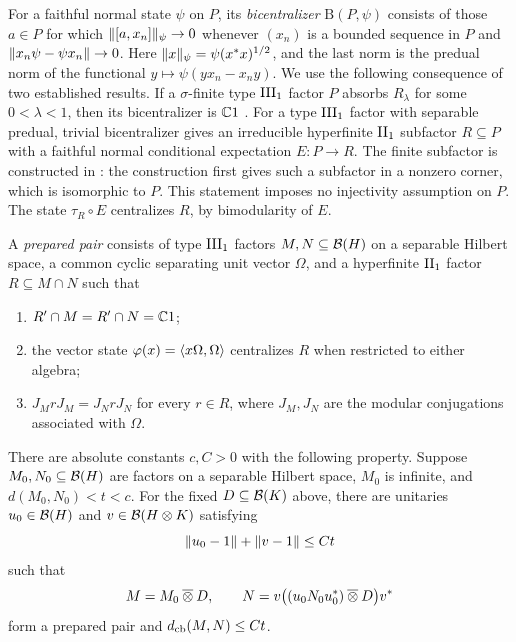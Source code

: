 For a faithful normal state $\psi$ on $P$, its \emph{bicentralizer}
$\mathrm{B}(P,\psi)$ consists of those $a\in P$ for which
$\lVert[a,x_n]\rVert_\psi\to0$ whenever $(x_n)$ is a bounded sequence in $P$
and $\lVert x_n\psi-\psi x_n\rVert\to0$.  Here
$\lVert x\rVert_\psi=\psi(x^*x)^{1/2}$, and the last norm is the predual norm
of the functional $y\mapsto\psi(yx_n-x_ny)$.
We use the following consequence of two established results.  If a
$\sigma$-finite type $\mathrm{III}_1$ factor $P$ absorbs $R_\lambda$ for some $0<\lambda<1$, then
its bicentralizer is $\mathbb C1$ \cite[Theorem~D(ii)]{Marrakchi2020}.  For a
type $\mathrm{III}_1$ factor with separable predual, trivial bicentralizer gives an
irreducible hyperfinite $\mathrm{II}_1$ subfactor $R\subseteq P$ with a faithful
normal conditional expectation $E:P\to R$.  The finite subfactor is
constructed in \cite[Lemma~3.8 and the proof of Theorem~3.1,
$(2)\Rightarrow(3)$, pp.~142--145]{Haagerup1987}: the construction first gives such a subfactor
in a nonzero corner, which is isomorphic to $P$.  This statement imposes
no injectivity assumption on $P$.  The state $\tau_R\circ E$ centralizes
$R$, by bimodularity of $E$.

\begin{definition}
\label{def:prepared-pair}
A \emph{prepared pair} consists of type $\mathrm{III}_1$ factors
$M,N\subseteq\mathcal B(H)$ on a separable Hilbert space, a common cyclic
separating unit vector $\Omega$, and a hyperfinite $\mathrm{II}_1$ factor
$R\subseteq M\cap N$ such that
\begin{enumerate}[label=\textup{(\roman*)}]
\item $R'\cap M=R'\cap N=\mathbb C1$;
\item the vector state $\varphi(x)=\langle x\Omega,\Omega\rangle$ centralizes $R$
when restricted to either algebra;
\item $J_MrJ_M=J_NrJ_N$ for every $r\in R$, where $J_M,J_N$ are the
modular conjugations associated with $\Omega$.
\end{enumerate}
\end{definition}

\begin{proposition}
\label{prop:prepared-pair}
There are absolute constants $c,C>0$ with the following property.
Suppose $M_0,N_0\subseteq\mathcal B(H)$ are factors on a separable
Hilbert space, $M_0$ is infinite, and $d(M_0,N_0)<t<c$.
For the fixed $D\subseteq\mathcal B(K)$
above, there are unitaries $u_0\in\mathcal B(H)$ and
$v\in\mathcal B(H\otimes K)$ satisfying
\[
 \lVert u_0-1\rVert+\lVert v-1\rVert\leq Ct
\]
such that
\[
 M=M_0\mathbin{\overline\otimes} D,\qquad
 N=v\bigl((u_0N_0u_0^*)\mathbin{\overline\otimes} D\bigr)v^*
\]
form a prepared pair and $d_{\mathrm{cb}}(M,N)\leq Ct$.
\end{proposition}

